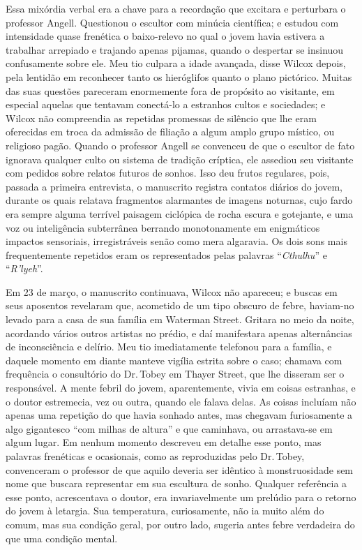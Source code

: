 Essa mixórdia verbal era a chave para a recordação que excitara e
perturbara o professor Angell. Questionou o escultor com minúcia
científica; e estudou com intensidade quase frenética o baixo-relevo no
qual o jovem havia estivera a trabalhar arrepiado e trajando apenas 
pijamas, quando o despertar se insinuou confusamente sobre ele. Meu
tio culpara a idade avançada, disse Wilcox depois, pela lentidão em
reconhecer tanto os hieróglifos quanto o plano pictórico. Muitas das
suas questões pareceram enormemente fora de propósito ao visitante, em
especial aquelas que tentavam conectá-lo a estranhos cultos e
sociedades; e Wilcox não compreendia as repetidas promessas de silêncio
que lhe eram oferecidas em troca da admissão de filiação a algum amplo
grupo místico, ou religioso pagão. Quando o professor Angell se
convenceu de que o escultor de fato ignorava qualquer culto ou sistema
de tradição críptica, ele assediou seu visitante com pedidos
sobre
relatos futuros de sonhos. Isso deu frutos regulares, pois, passada a
primeira entrevista, o manuscrito registra contatos diários do jovem,
durante os quais relatava fragmentos alarmantes de imagens noturnas,
cujo fardo era sempre alguma terrível paisagem ciclópica de rocha escura
e gotejante, e uma voz ou inteligência subterrânea berrando
monotonamente em enigmáticos impactos sensoriais, irregistráveis senão
como mera algaravia. Os dois sons mais frequentemente repetidos eram os
representados pelas palavras ``\emph{Cthulhu}'' e ``\emph{R'lyeh}''.

Em 23 de março, o manuscrito continuava, Wilcox não apareceu; e buscas em
seus aposentos revelaram que, acometido de um tipo obscuro de febre, 
haviam-no levado para a casa de sua família em Waterman Street. Gritara no
meio da noite, acordando vários outros artistas no prédio, e daí
manifestara apenas alternâncias de inconsciência e delírio. Meu tio
imediatamente telefonou para a família, e daquele momento em diante
manteve vigília estrita sobre o caso; chamava com frequência o
consultório do Dr.\,Tobey em Thayer Street, que lhe disseram ser o
responsável. A mente febril do jovem, aparentemente, vivia em coisas
estranhas, e o doutor estremecia, vez ou outra, quando ele falava delas.
As coisas incluíam não apenas uma repetição do que havia sonhado antes,
mas chegavam furiosamente a algo gigantesco ``com milhas de altura'' e
que caminhava, ou arrastava-se em algum lugar. Em nenhum momento
descreveu em detalhe esse ponto, mas palavras frenéticas e ocasionais,
como as reproduzidas pelo Dr.\,Tobey, convenceram o professor de que
aquilo deveria ser idêntico à monstruosidade sem nome que buscara
representar em sua escultura de sonho. Qualquer referência a esse ponto,
acrescentava o doutor, era invariavelmente um prelúdio para o retorno do
jovem à letargia. Sua temperatura, curiosamente, não ia muito além do
comum, mas sua condição geral, por outro lado, sugeria antes febre
verdadeira do que uma condição mental.


